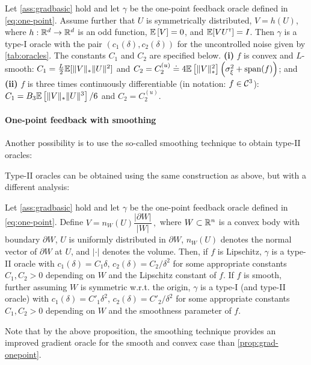 \begin{proposition}
\label{prop:grad-onepoint}
Let \cref{ass:gradbasic} hold and let $\gamma$ be the one-point feedback oracle defined in \eqref{eq:one-point}.
Assume further that
  $U$ is symmetrically distributed,
  $V = h(U)$, where $h:\mathbb{R}^d \to \mathbb{R}^d$ is an odd function,
  $\mathbb{E}\left[V\right]=0$, and $\mathbb{E}[V U^\mathsf{\scriptscriptstyle T}] = I$.
Then $\gamma$ is a type-I oracle with the pair $(c_1(\delta),c_2(\delta))$  for the uncontrolled noise
given by \cref{tab:oracles}. The constants $C_1$ and $C_2$ are specified below.
\textbf{(i)} $f$ is convex and $L$-smooth: $C_1 =
\frac{L}{2} \mathbb{E}[ \|V\|_* \|U\|^2]$ and $C_2 =  C_{2}^{(u)} \doteq 4 \mathbb{E}\left[\|V\|_*^2\right]\left( \sigma_\xi^2+\operatorname{span}(f)\right)$; and\\
\textbf{(ii)} $f$ is three times continuously differentiable (in notation: $f \in \mathcal{C}^3$): 
$C_1 = B_3 \mathbb{E}\left[ \|V\|_* \|U\|^3 \right]/6$ and $C_2 =  C_{2}^{(u)}$.  
\end{proposition}

\paragraph{One-point feedback with smoothing}
Another possibility is to use the so-called smoothing technique
\citep{PoTsy90,flaxman2005online,HaLe14:SOC}
to obtain type-II oracles:


Type-II oracles can be obtained using the same construction as above, but with a different analysis:
\begin{proposition}
\label{prop:flaxman} Let \cref{ass:gradbasic} hold and let $\gamma$ be the one-point feedback oracle defined in \eqref{eq:one-point}.
Define
$
V = n_W(U)\dfrac{\lvert \partial W\rvert}{\lvert W \rvert}\,,
$
where $W \subset \mathbb{R}^n$ is a convex body with boundary $\partial W$, $U$ is uniformly distributed in $\partial W$, $n_W(U)$ denotes the normal vector of $\partial W$ at $U$, and $\lvert \cdot \rvert$ denotes the volume.
Then, if $f$ is Lipschitz, $\gamma$ is a type-II oracle with $c_1(\delta)=C_1 \delta$, $c_2(\delta) = C_2/\delta^2$ for some appropriate constants $C_1,C_2>0$ depending on $W$ and the Lipschitz constant of $f$.
If $f$ is smooth, further assuming $W$ is symmetric w.r.t. the origin, $\gamma$ is a type-I (and type-II oracle) with $c_1(\delta) = C'_1\delta^2$, $c_2(\delta) = C'_2/\delta^2$ for some appropriate constants $C_1,C_2>0$ depending on $W$ and the smoothness parameter of $f$.
\end{proposition}
Note that by the above proposition, the smoothing technique provides an improved gradient oracle for the smooth and convex case than \cref{prop:grad-onepoint}.



